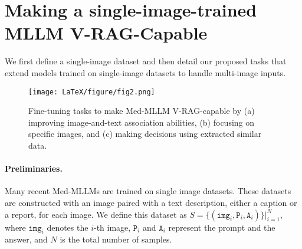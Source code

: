 \section{Making a single-image-trained MLLM V-RAG-Capable}
\label{sec:single-image}
We first define a single-image dataset and then detail our proposed tasks that extend models trained on single-image datasets to handle multi-image inputs.



\begin{figure*}[t]
    \centering
    \setlength{\abovecaptionskip}{1mm}
    \texttt{[image: LaTeX/figure/fig2.png]}
    \caption{Fine-tuning tasks to make Med-MLLM V-RAG-capable by (a) improving image-and-text association abilities, (b) focusing on specific images, and (c) making decisions using extracted similar data.}
    \label{fig:tasks}
\end{figure*}



\paragraph{Preliminaries.}
Many recent Med-MLLMs are trained on single image datasets. 
These datasets are constructed with an image paired with a text description, either a caption or a report, for each image. 
We define this dataset as $S = \{(\texttt{img}_{i}, \texttt{P}_i, \texttt{A}_i)\}|^{N}_{i=1}$, where $\texttt{img}_{i}$ denotes the $i$-th image, $\texttt{P}_i$ and $\texttt{A}_i$ represent the prompt and the answer, and $N$ is the total number of samples.

